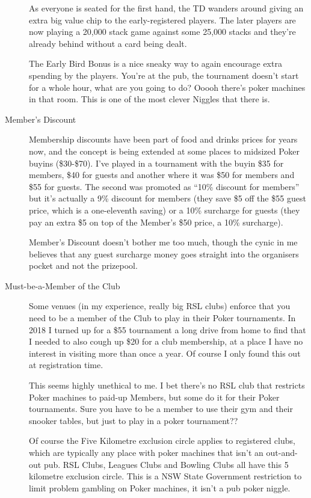 \begin{description}
As everyone is seated for the first hand, the TD wanders around
giving an extra big value chip to the early-registered players. The
later players are now playing a 20,000 stack game against some
25,000 stacks and they're already behind without a card being dealt.

The Early Bird Bonus is a nice sneaky way to again encourage extra
spending by the players. You're at the pub, the tournament doesn't
start for a whole hour, what are you going to do? Ooooh there's poker
machines in that room. This is one of the most clever Niggles that
there is.

\item[Member's Discount] Membership discounts have been part
of food and drinks prices for years now, and the concept
is being extended at some places to midsized Poker buyins
(\$30-\$70). I've played in a tournament with the buyin
\$35 for members, \$40 for guests and another where it was \$50
for members and \$55 for guests. The second was promoted as ``10\%
discount for members'' but it's actually a 9\% discount for members
(they save \$5 off the \$55 guest price, which is a one-eleventh saving)
or a 10\% surcharge for guests (they pay an extra \$5 on top of the
Member's \$50 price, a 10\% surcharge).

Member's Discount doesn't bother me too much, though the
cynic in me believes that any guest surcharge money
goes straight into the organisers pocket and not the prizepool.

\item[Must-be-a-Member of the Club] Some venues (in my experience,
really big RSL clubs) enforce that you need to be a member of the Club
to play in their Poker tournaments. In 2018 I turned up for a \$55
tournament a long drive from home to find that I needed to also cough
up \$20 for a club membership, at a place I have no interest in visiting
more than once a year. Of course I only found this out at registration
time.

This seems highly unethical to me. I bet there's no RSL club that
restricts Poker machines to paid-up Members, but some do it for
their Poker tournaments. Sure you have to be a member to use
their gym and their snooker tables, but just to play
in a poker tournament??

Of course the Five Kilometre exclusion circle applies to registered
clubs, which are typically any place with poker machines that isn't an
out-and-out pub. RSL Clubs, Leagues Clubs and Bowling Clubs all have
this 5 kilometre exclusion circle. This is a NSW State Government
restriction to limit problem gambling on Poker machines, it isn't a
pub poker niggle.


\end{description}
